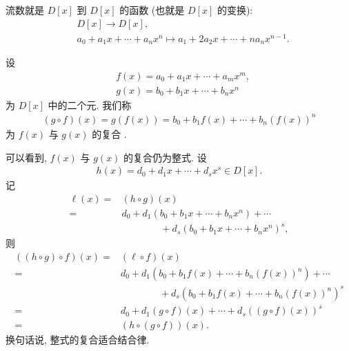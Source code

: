 \begin{remark}
    流数就是 $D[x]$ 到 $D[x]$ 的函数 (也就是 $D[x]$ 的变换):
    \begin{align*}
         & D[x] \to D[x], \tag*{$\prime \colon$}                                        \\
         & a_0 + a_1 x + \cdots + a_n x^n \mapsto a_1 + 2a_2 x + \cdots + na_n x^{n-1}.
    \end{align*}
\end{remark}

\begin{definition}
    设
    \begin{align*}
         & f(x) = a_0 + a_1 x + \cdots + a_m x^m, \\
         & g(x) = b_0 + b_1 x + \cdots + b_n x^n
    \end{align*}
    为 $D[x]$ 中的二个元. 我们称
    \begin{align*}
        (g \circ f)(x) = g(f(x)) = b_0 + b_1 f(x) + \cdots + b_n (f(x))^n
    \end{align*}
    为 $f(x)$ 与 $g(x)$ 的复合 .
\end{definition}

\begin{remark}
    可以看到, $f(x)$ 与 $g(x)$ 的复合仍为整式. 设
    \begin{align*}
        h(x) = d_0 + d_1 x + \cdots + d_s x^s \in D[x].
    \end{align*}
    记
    \begin{align*}
        \ell(x)
        = {} & (h \circ g) (x)                                         \\
        = {} & d_0 + d_1 (b_0 + b_1 x + \cdots + b_n x^n) + \cdots     \\
             & \qquad \qquad + d_s (b_0 + b_1 x + \cdots + b_n x^n)^s,
    \end{align*}
    则
    \begin{align*}
        ((h \circ g) \circ f) (x)
        = {} & (\ell \circ f) (x)                                             \\
        = {} & d_0 + d_1 (b_0 + b_1 f(x) + \cdots + b_n (f(x))^n) + \cdots    \\
             & \qquad \qquad + d_s (b_0 + b_1 f(x) + \cdots + b_n (f(x))^n)^s \\
        = {} & d_0 + d_1 (g \circ f) (x) + \cdots + d_s ((g \circ f) (x))^s   \\
        = {} & (h \circ (g \circ f)) (x).
    \end{align*}
    换句话说, 整式的复合适合结合律.
\end{remark}

